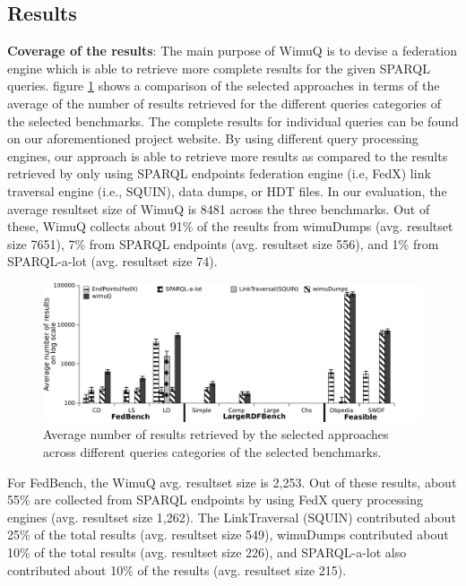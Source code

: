 \subsection{Results}
\textbf{Coverage of the results}: The main purpose of WimuQ is to devise a federation engine which is able to retrieve more complete results for the given SPARQL queries. %
figure \ref{fig:numberRes1} shows a comparison of the selected approaches in terms of the average of the number of results retrieved for the different queries categories of the selected benchmarks. The complete results for individual queries can be found on our aforementioned project website. By using different query processing engines, our approach is able to retrieve more results as compared to the results retrieved by only using SPARQL endpoints federation engine (i.e, FedX) link traversal engine (i.e., SQUIN), data dumps, or  HDT files. In our evaluation, the average resultset size of WimuQ is 8481 across the three benchmarks. Out of these, WimuQ collects about 91\% of the results from wimuDumps (avg. resultset size 7651), 7\% from SPARQL endpoints (avg. resultset size 556), and 1\% from SPARQL-a-lot (avg. resultset size 74). 

\begin{figure}[htb]
    \includegraphics[width=\linewidth]{img/numberRes1.pdf}
	\caption{Average number of results retrieved by the selected approaches across different queries categories of the selected benchmarks.}
	\label{fig:numberRes1}
\end{figure}

For FedBench, the WimuQ avg. resultset size is 2,253. Out of these results, about 55\% are collected from SPARQL endpoints by using FedX query processing engines (avg. resultset size 1,262). The LinkTraversal (SQUIN) contributed about 25\% of the total results (avg. resultset size 549), wimuDumps contributed about 10\% of the total results (avg. resultset size 226), and SPARQL-a-lot also contributed about 10\% of the results (avg. resultset size 215). 

